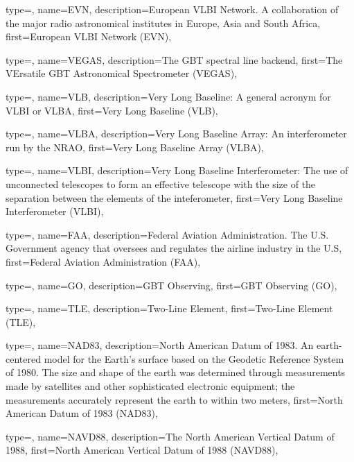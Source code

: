 {
  type=\acronymtype,
  name={EVN},
  description={European VLBI Network.
A collaboration of the major radio astronomical institutes
in Europe, Asia and South Africa},
  first={European VLBI Network (EVN)},
} 

{
  type=\acronymtype,
  name={VEGAS},
  description={The GBT spectral line backend},
  first={The VErsatile GBT Astronomical Spectrometer (VEGAS)},
} 

{
  type=\acronymtype,
  name={VLB},
  description={Very Long Baseline: A general acronym for VLBI or VLBA},
  first={Very Long Baseline (VLB)},
} 

{
  type=\acronymtype,
  name={VLBA},
  description={Very Long Baseline Array: An interferometer run by the NRAO},
  first={Very Long Baseline Array (VLBA)},
} 

{
  type=\acronymtype,
  name={VLBI},
  description={Very Long Baseline Interferometer: The use of unconnected
               telescopes to form an effective telescope with the size of
               the separation between the elements of the inteferometer},
  first={Very Long Baseline Interferometer (VLBI)},
} 

{
  type=\acronymtype,
  name={FAA},
  description={Federal Aviation Administration.
The U.S. Government agency that oversees and regulates the
airline industry in the U.S},
  first={Federal Aviation Administration (FAA)},
}

{
  type=\acronymtype,
  name={GO},
  description={GBT Observing},
  first={GBT Observing (GO)},
}

{
  type=\acronymtype,
  name={TLE},
  description={Two-Line Element},
  first={Two-Line Element (TLE)},
}


{
  type=\acronymtype,
  name={NAD83},
  description={North American Datum of 1983.
An earth-centered model for the Earth's surface based on 
  the Geodetic Reference System of 1980. The size and shape of the earth was 
  determined through measurements made by satellites and other sophisticated 
  electronic equipment; the measurements accurately represent the earth to 
  within two meters},
first={North American Datum of 1983 (NAD83)},
} 

{
  type=\acronymtype,
  name={NAVD88},
  description={The North American Vertical Datum of 1988},
first={North American Vertical Datum of 1988 (NAVD88)},
} 


